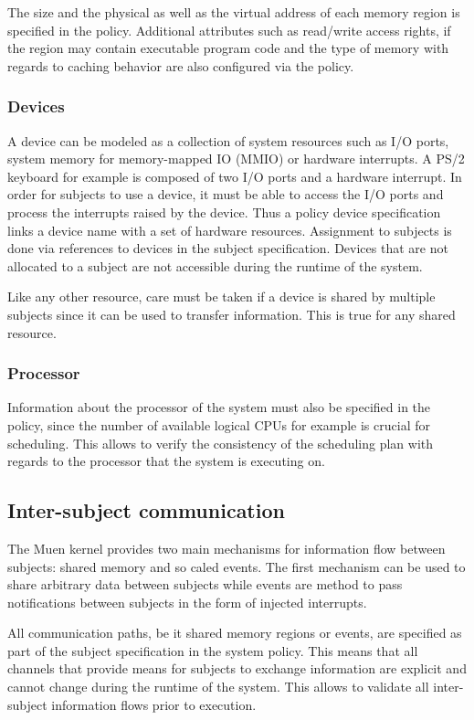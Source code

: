 The size and the physical as well as the virtual address of each memory region
is specified in the policy. Additional attributes such as read/write access
rights, if the region may contain executable program code and the type of memory
with regards to caching behavior are also configured via the policy.

\subsubsection{Devices}
A device can be modeled as a collection of system resources such as I/O ports,
system memory for memory-mapped IO (MMIO) or hardware interrupts. A PS/2
keyboard for example is composed of two I/O ports and a hardware interrupt.
In order for subjects to use a device, it must be able to access the I/O ports
and process the interrupts raised by the device. Thus a policy device
specification links a device name with a set of hardware resources. Assignment
to subjects is done via references to devices in the subject specification.
Devices that are not allocated to a subject are not accessible during the
runtime of the system.

Like any other resource, care must be taken if a device is shared by multiple
subjects since it can be used to transfer information. This is true for any
shared resource.

\subsubsection{Processor}
Information about the processor of the system must also be specified in the
policy, since the number of available logical CPUs for example is crucial for
scheduling. This allows to verify the consistency of the scheduling plan with
regards to the processor that the system is executing on.

\subsection{Inter-subject communication}
The Muen kernel provides two main mechanisms for information flow between
subjects: shared memory and so caled events. The first mechanism can be used to
share arbitrary data between subjects while events are method to pass
notifications between subjects in the form of injected interrupts.

All communication paths, be it shared memory regions or events, are specified as
part of the subject specification in the system policy. This means that all
channels that provide means for subjects to exchange information are explicit
and cannot change during the runtime of the system. This allows to validate all
inter-subject information flows prior to execution.

